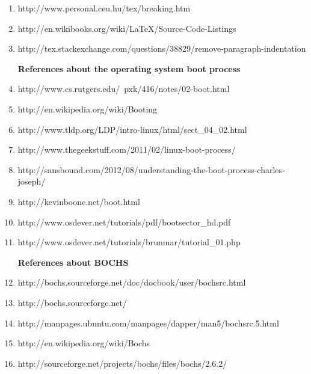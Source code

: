 \documentclass[11pt]{article}
\begin{document}
\begin{enumerate}
  \item  {http://www.personal.ceu.hu/tex/breaking.htm}
      
  \item  {http://en.wikibooks.org/wiki/LaTeX/Source-Code-Listings}
  
    \item {http://tex.stackexchange.com/questions/38829/remove-paragraph-indentation}
  
  \vspace {3 mm}
  
  \textbf{ References about the operating system boot process  }    
  
  \item  {http://www.cs.rutgers.edu/~pxk/416/notes/02-boot.html}
  
  \item  {http://en.wikipedia.org/wiki/Booting}
  
  \item  {http://www.tldp.org/LDP/intro-linux/html/sect\_04\_02.html}
  
  \item  {http://www.thegeekstuff.com/2011/02/linux-boot-process/}
  
  \item  {http://sansbound.com/2012/08/understanding-the-boot-process-charles-joseph/}
  
  \item  {http://kevinboone.net/boot.html}
  
  \item  {http://www.osdever.net/tutorials/pdf/bootsector\_hd.pdf}
  
  \item  {http://www.osdever.net/tutorials/brunmar/tutorial\_01.php}
  
  \vspace {3 mm}
  
  \textbf{ References about BOCHS  }    
  
  \item  {http://bochs.sourceforge.net/doc/docbook/user/bochsrc.html}  
  
  \item  {http://bochs.sourceforge.net/ }
  
  \item  {http://manpages.ubuntu.com/manpages/dapper/man5/bochsrc.5.html}
  
  \item  {  http://en.wikipedia.org/wiki/Bochs }
  
  \item  {  http://sourceforge.net/projects/bochs/files/bochs/2.6.2/ }
  

\end{enumerate}
\end{document}
